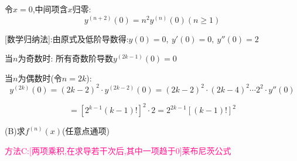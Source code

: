 \documentclass[11pt,a4paper,UTF8]{ctexart}
\begin{document}
\begin{solbox}[分步推导与答题规范]
令$x = 0$,中间项含$x$归零:
\begin{equation*}
y^{(n+2)}(0) = n^2 y^{(n)}(0) (n \ge 1)
\end{equation*}


[数学归纳法]:由原式及低阶导数得:$y(0) = 0,\ y'(0) = 0,\ y''(0) = 2$

当$n$为奇数时:		所有奇数阶导数$y^{(2k-1)}(0) = 0$

当$n$为偶数时(令$n = 2k$): 
\begin{equation*}
y^{(2k)}(0) = (2k-2)^2 \cdot y^{(2k-2)}(0)= (2k-2)^2 \cdot (2k-4)^2 \cdots 2^2 \cdot y''(0)
\end{equation*}


			
\begin{equation*}
= [2^{k-1} (k-1)!]^2 \cdot 2 = 2^{2k-1} [(k-1)!]^2
\end{equation*}

\end{solbox}

\textit{}(B)求$f^(n)(x)$(任意点通项)\textit{}

\textcolor{DeepPink}{方法C:[两项乘积,在求导若干次后,其中一项趋于0]莱布尼茨公式}
\end{document}
